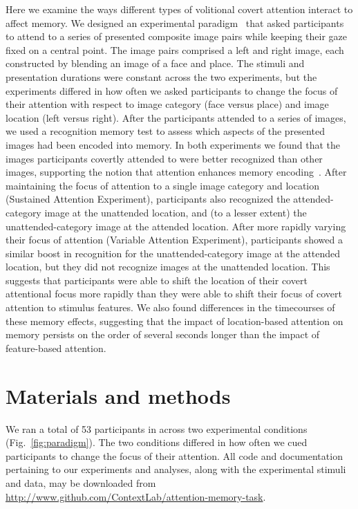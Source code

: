 \documentclass[english]{article}
\begin{document}
Here we examine the ways different types of volitional covert attention
interact to affect memory. We designed an experimental
paradigm~\citep[following][]{Posn80} that asked participants to attend to a
series of presented composite image pairs while keeping their gaze fixed on a
central point. The image pairs comprised a left and right image, each
constructed by blending an image of a face and place. The stimuli and
presentation durations were constant across the two experiments, but the
experiments differed in how often we asked participants to change the focus of
their attention with respect to image category (face versus place) and image
location (left versus right). After the participants attended to a series of
images, we used a recognition memory test to assess which aspects of the
presented images had been encoded into memory. In both experiments we found
that the images participants covertly attended to were better recognized than
other images, supporting the notion that attention enhances memory
encoding~\citep[i.e., they rated attended images as more familiar than
unattended images;][]{Yone02}. After maintaining the focus of attention to a
single image category and location (Sustained Attention Experiment),
participants also recognized the attended-category image at the unattended
location, and (to a lesser extent) the unattended-category image at the
attended location. After more rapidly varying their focus of attention
(Variable Attention Experiment), participants showed a similar boost in
recognition for the unattended-category image at the attended location, but
they did not recognize images at the unattended location. This suggests that
participants were able to shift the location of their covert attentional focus
more rapidly than they were able to shift their focus of covert attention to
stimulus features. We also found differences in the timecourses of these memory
effects, suggesting that the impact of location-based attention on memory
persists on the order of several seconds longer than the impact of
feature-based attention.

\section*{Materials and methods}

We ran a total of 53 participants in across two experimental conditions
(Fig.~\ref{fig:paradigm}). The two conditions differed in how often we
cued participants to change the focus of their attention. All code and
documentation pertaining to our experiments and analyses, along with the
experimental stimuli and data, may be downloaded from
\url{http://www.github.com/ContextLab/attention-memory-task}.
\end{document}
